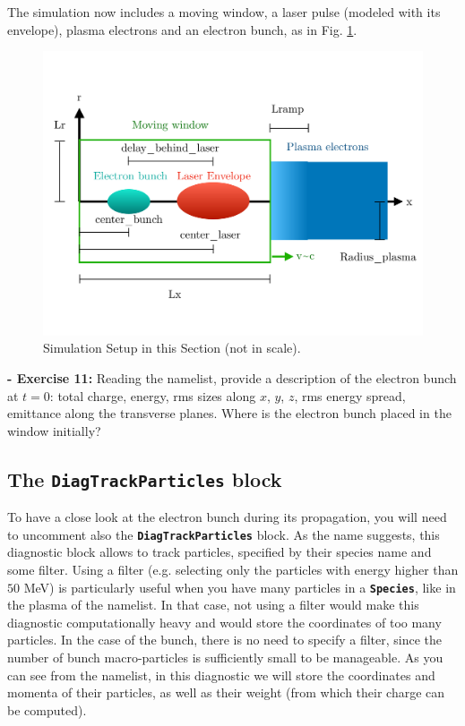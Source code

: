 \documentclass[a4paper,12pt]{extarticle}
\newcommand{\commandline}[1]{\texttt{\textbf{#1}}}
\begin{document}
The simulation now includes a moving window, a laser pulse (modeled with its envelope), plasma electrons and an electron bunch, as in Fig. \ref{Schema3}.\\

\begin{figure}[h!]
  \begin{center}
  \includegraphics[scale=0.3]{Schema_Simulation_3.pdf}
  \end{center}
  \caption{Simulation Setup in this Section (not in scale).}
  \label{Schema3}
\end{figure}

\textbf{ - Exercise 11:} Reading the namelist, provide a description of the electron bunch at $t=0$: total charge, energy, rms sizes along $x$, $y$, $z$, rms energy spread, emittance along the transverse planes. Where is the electron bunch placed in the window initially? \\

\subsection*{The \commandline{DiagTrackParticles} block}
To have a close look at the electron bunch during its propagation,  you will need to uncomment also the \commandline{DiagTrackParticles} block. As the name suggests, this diagnostic block allows to track particles, specified by their species name and some filter. Using a filter (e.g. selecting only the particles with energy higher than $50$ MeV) is particularly useful when you have many particles in a \commandline{Species}, like in the plasma of the namelist. In that case, not using a filter would make this diagnostic computationally heavy and would store the coordinates of too many particles. In the case of the bunch, there is no need to specify a filter, since the number of bunch macro-particles is sufficiently small to be manageable. As you can see from the namelist, in this diagnostic we will store the coordinates and momenta of their particles, as well as their weight (from which their charge can be computed). \\
\end{document}
